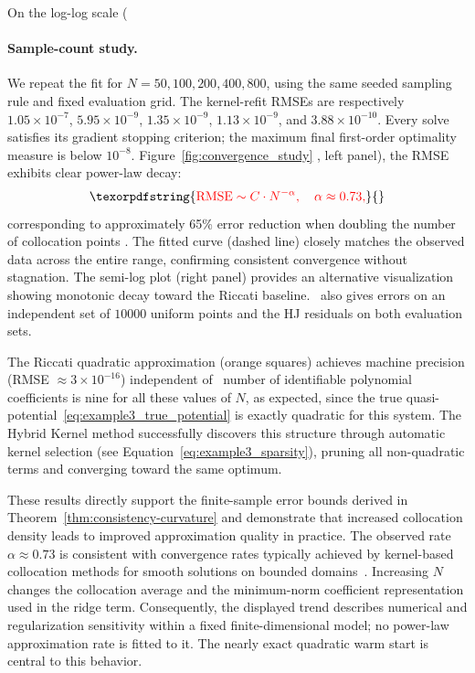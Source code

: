\documentclass[11pt]{article}
\theoremstyle{plain}      %
\theoremstyle{definition} %
\providecommand{\DIFaddtex}[1]{{\protect\color{blue}#1}} %
\providecommand{\DIFdeltex}[1]{{\protect\color{red}#1}} %
\providecommand{\DIFaddbegin}{} %
\providecommand{\DIFaddend}{} %
\providecommand{\DIFdelbegin}{} %
\providecommand{\DIFdelend}{} %
\providecommand{\DIFadd}[1]{\texorpdfstring{\DIFaddtex{#1}}{#1}} %
\providecommand{\DIFdel}[1]{\texorpdfstring{\DIFdeltex{#1}}{}} %
\newcommand{\DIFscaledelfig}{1.0}
\newlength{\DIFdelgraphicswidth} %
\newlength{\DIFdelgraphicsheight} %
\newcommand{\DIFaddincludegraphics}[2][]{{\color{blue}\fbox{\DIFOincludegraphics[#1]{#2}}}} %
\newcommand{\DIFdelincludegraphics}[2][]{%
\sbox{\DIFdelgraphicsbox}{\DIFOincludegraphics[#1]{#2}}%
\settoboxwidth{\DIFdelgraphicswidth}{\DIFdelgraphicsbox} %
\settoboxtotalheight{\DIFdelgraphicsheight}{\DIFdelgraphicsbox} %
\scalebox{\DIFscaledelfig}{%
\parbox[b]{\DIFdelgraphicswidth}{\usebox{\DIFdelgraphicsbox}\\[-\baselineskip] \rule{\DIFdelgraphicswidth}{0em}}\llap{\resizebox{\DIFdelgraphicswidth}{\DIFdelgraphicsheight}{%
\setlength{\unitlength}{\DIFdelgraphicswidth}%
\begin{picture}(1,1)%
\thicklines\linethickness{2pt} %
{\color[rgb]{1,0,0}\put(0,0){\framebox(1,1){}}}%
{\color[rgb]{1,0,0}\put(0,0){\line( 1,1){1}}}%
{\color[rgb]{1,0,0}\put(0,1){\line(1,-1){1}}}%
\end{picture}%
}\hspace*{3pt}}} %
} %
\DeclareRobustCommand{\DIFaddbegin}{\DIFOaddbegin \let\includegraphics\DIFaddincludegraphics} %
\DeclareRobustCommand{\DIFaddend}{\DIFOaddend \let\includegraphics\DIFOincludegraphics} %
\DeclareRobustCommand{\DIFdelbegin}{\DIFOdelbegin \let\includegraphics\DIFdelincludegraphics} %
\DeclareRobustCommand{\DIFdelend}{\DIFOaddend \let\includegraphics\DIFOincludegraphics} %
\begin{document}
\DIFdel{On the log-log scale (}\DIFdelend \DIFaddbegin \paragraph{\DIFadd{Sample-count study.}}\label{sec:empirical-convergence}
\DIFadd{We repeat the fit for $N=50,100,200,400,800$, using the same seeded sampling rule and fixed evaluation grid. The kernel-refit RMSEs are respectively $1.05\times10^{-7}$, $5.95\times10^{-9}$, $1.35\times10^{-9}$, $1.13\times10^{-9}$, and $3.88\times10^{-10}$. Every solve satisfies its gradient stopping criterion; the maximum final first-order optimality measure is below $10^{-8}$. }\DIFaddend Figure~\ref{fig:convergence_study} \DIFdelbegin \DIFdel{, left panel), the RMSE 
exhibits clear power-law decay:
}\begin{displaymath}\DIFdel{\label{old:eq:convergence_rate}
\text{RMSE} \sim C \cdot N^{-\alpha}, \quad \alpha \approx 0.73,
}\end{displaymath}%
\DIFdel{corresponding to approximately 65\% error reduction when doubling the number of collocation points . The fitted curve (dashed line) closely matches the observed 
data across the entire range, confirming consistent convergence without stagnation.
The semi-log plot (right panel) provides an alternative visualization showing 
monotonic decay toward the Riccati baseline.
}\DIFdelend\ \DIFaddbegin \DIFadd{also gives errors on an independent set of $10000$ uniform points and the HJ residuals on both evaluation sets.
}\DIFaddend 

The \DIFdelbegin \DIFdel{Riccati quadratic approximation (orange squares) achieves machine precision 
(RMSE $\approx 3 \times 10^{-16}$) independent of }\DIFdelend\ \DIFaddbegin \DIFadd{number of identifiable polynomial coefficients is nine for all these values of }\DIFaddend $N$\DIFdelbegin \DIFdel{, as expected, since the 
true quasi-potential~\eqref{eq:example3_true_potential} is exactly quadratic for this system. The Hybrid Kernel method successfully discovers this structure 
through automatic kernel selection (see Equation~\eqref{eq:example3_sparsity}), 
pruning all non-quadratic terms and converging toward the same optimum. }%

\DIFdel{These results directly support the finite-sample error bounds derived in 
Theorem~\ref{thm:consistency-curvature} and demonstrate that increased collocation density 
leads to improved approximation quality in practice. The observed rate 
$\alpha \approx 0.73$ is consistent with convergence rates typically achieved by 
kernel-based collocation methods for smooth solutions on bounded domains}\DIFdelend\ \DIFaddbegin \DIFadd{. Increasing $N$ changes the collocation average and the minimum-norm coefficient representation used in the ridge term. Consequently, the displayed trend describes numerical and regularization sensitivity within a fixed finite-dimensional model; no power-law approximation rate is fitted to it. The nearly exact quadratic warm start is central to this behavior}\DIFaddend .
\end{document}
